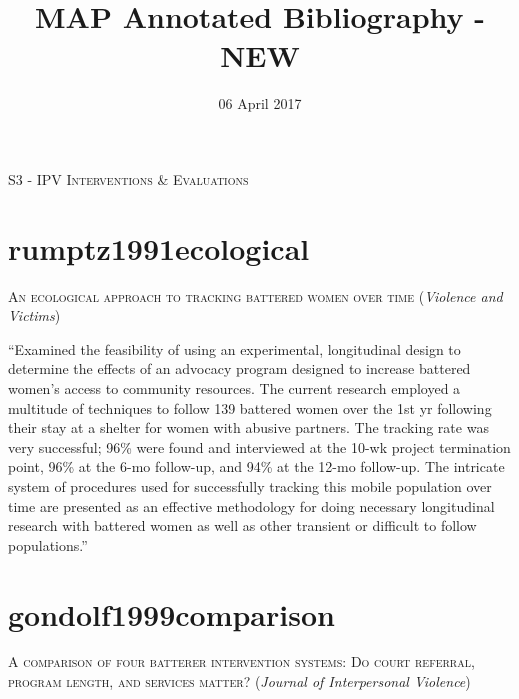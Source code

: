 \documentclass[]{tufte-handout}
\title{MAP Annotated Bibliography - NEW}
\date{06 April 2017}
\begin{document}
\maketitle



{
\setcounter{tocdepth}{1}
\tableofcontents
}

\newpage

\centerline{\Large{\textsc{S3 - IPV Interventions \& Evaluations}}}

\section{\texorpdfstring{\textcolor[HTML]{5b0057}{rumptz1991ecological}}{}}\label{section}

\textsc{\large{An ecological approach to tracking battered women over time}}
(\emph{Violence and Victims})

``Examined the feasibility of using an experimental, longitudinal design
to determine the effects of an advocacy program designed to increase
battered women's access to community resources. The current research
employed a multitude of techniques to follow 139 battered women over the
1st yr following their stay at a shelter for women with abusive
partners. The tracking rate was very successful; 96\% were found and
interviewed at the 10-wk project termination point, 96\% at the 6-mo
follow-up, and 94\% at the 12-mo follow-up. The intricate system of
procedures used for successfully tracking this mobile population over
time are presented as an effective methodology for doing necessary
longitudinal research with battered women as well as other transient or
difficult to follow populations.''

\section{\texorpdfstring{\textcolor[HTML]{5b0057}{gondolf1999comparison}}{}}\label{section-1}

\textsc{\large{A comparison of four batterer intervention systems: Do court referral, program length, and services matter?}}
(\emph{Journal of Interpersonal Violence})
\end{document}
